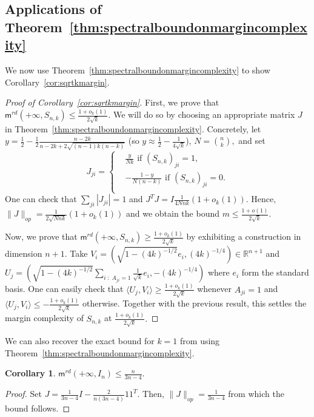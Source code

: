 \documentclass[preprint]{article}
\newtheorem{corollary}{Corollary}[]
\newcommand{\maxmargin}{\mathsf{m}^{rd}}
\newcommand{\ksparsen}{S_{n,k}}
\begin{document}
\subsection{Applications of Theorem~\texorpdfstring{\ref{thm:spectralboundonmargincomplexity}}{Spectral Bound}}
We now use Theorem~\ref{thm:spectralboundonmargincomplexity} to show Corollary~\ref{cor:sqrtkmargin}.

\begin{proof}[Proof of Corollary~\ref{cor:sqrtkmargin}]
First, we prove that $\maxmargin(+\infty, \ksparsen)\le \frac{1+o_k(1)}{2\sqrt{k}}.$ We will do so by choosing an appropriate matrix $J$ in Theorem~\ref{thm:spectralboundonmargincomplexity}. Concretely, let $y = \frac{1}{2}-\frac{1}{2}\frac{n-2k}{n-2k + 2\sqrt{(n-1)k(n-k)}}$ (so $y \approx \frac{1}{2}-\frac{1}{4\sqrt{k}}$), $N = \binom{n}{k},$ and set 
$$
J_{ji} = 
\begin{cases}
    & \frac{y}{Nk} \text{ if }(\ksparsen)_{ji} = 1,\\ 
    & -\frac{1-y}{N(n-k)} \text{ if }(\ksparsen)_{ji} = 0.\\ 
\end{cases}
$$
One can check that $\sum_{ji}|J_{ji}| = 1$ and $J^TJ = I \frac{1}{4Nnk}(1  + o_k(1)).$ Hence, $\|J\|_{op} = \frac{1}{2\sqrt{Nnk}}(1 + o_k(1))$ and we obtain the bound $m \le \frac{1 + o(1)}{2\sqrt{k}}.$

Now, we prove that $\maxmargin(+\infty, \ksparsen)\ge \frac{1+o_k(1)}{2\sqrt{k}}$ by exhibiting a construction in dimension $n+1.$
    Take $V_i = (\sqrt{1 - (4k)^{-1/2}}e_i,  (4k)^{-1/4})\in \mathbb{R}^{n+1}$ and $U_j = (\sqrt{1 - (4k)^{-1/2}}\sum_{i\; : \; A_{ji} = 1}\frac{1}{\sqrt{k}}e_i ,-(4k)^{-1/4})$ where $e_i$ form the standard basis. One can easily check that $\langle U_j, V_i\rangle \ge \frac{1+o_k(1)}{2\sqrt{k}}$ whenever $A_{ji} = 1$ and $\langle U_j, V_i\rangle \le - \frac{1+o_k(1)}{2\sqrt{k}}$ otherwise. Together with the previous result, this settles the margin complexity of $\ksparsen$ at $\frac{1+o_k(1)}{2\sqrt{k}}.$
\end{proof}

We can also recover the exact bound for $k = 1$ from \cite{bangachev2025globalminimizerssigmoidcontrastive} using Theorem~\ref{thm:spectralboundonmargincomplexity}.

\begin{corollary}
$\maxmargin(+\infty, I_n)\le \frac{n}{3n-4}.$
\end{corollary}
\begin{proof} Set $J = \frac{1}{3n-4}I - \frac{2}{n(3n-4)}11^T.$ Then, $\|J\|_{op} = \frac{1}{3n-4}$ from which the bound follows. 
\end{proof}
\end{document}
